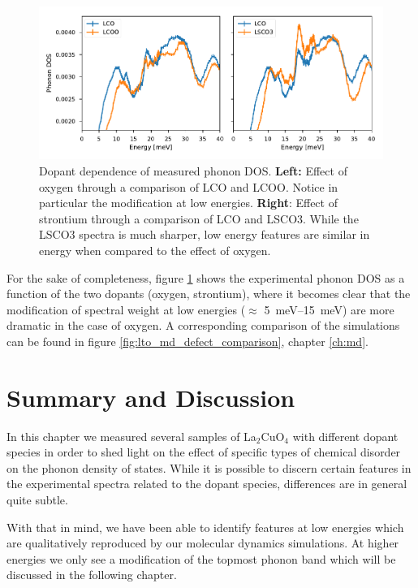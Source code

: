 \begin{figure}
    \centering
    \includegraphics[width=\textwidth]{fig/gdos/in4_low_energy_compare.pdf}
    \caption{Dopant dependence of measured phonon DOS. \textbf{Left:} Effect of oxygen through a comparison of LCO and LCOO. Notice in particular the modification at low energies. \textbf{Right}: Effect of strontium through a comparison of LCO and LSCO3. While the LSCO3 spectra is much sharper, low energy features are similar in energy when compared to the effect of oxygen.}
    \label{fig:in4_low_energy_compare}
\end{figure}

For the sake of completeness, figure \ref{fig:in4_low_energy_compare} shows the experimental phonon DOS as a function of the two dopants (oxygen, strontium), where it becomes clear that the modification of spectral weight at low energies ($\approx$ \SIrange{5}{15}{\milli\eV}) are more dramatic in the case of oxygen. A corresponding comparison of the simulations can be found in figure \ref{fig:lto_md_defect_comparison}, chapter \ref{ch:md}.

\section{Summary and Discussion}
In this chapter we measured several samples of La$_2$CuO$_4$ with different dopant species in order to shed light on the effect of specific types of chemical disorder on the phonon density of states. While it is possible to discern certain features in the experimental spectra related to the dopant species, differences are in general quite subtle.

With that in mind, we have been able to identify features at low energies which are qualitatively reproduced by our molecular dynamics simulations. At higher energies we only see a modification of the topmost phonon band which will be discussed in the following chapter.

